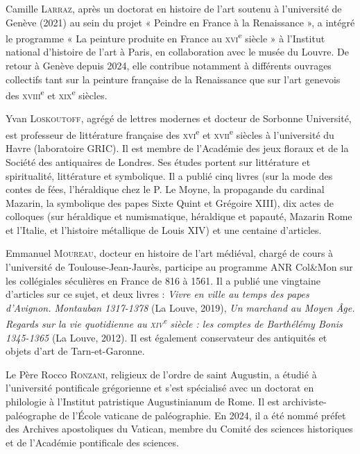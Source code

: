 \documentclass[12pt,twoside,openany]{book}
\begin{document}
Camille \textsc{Larraz}, après un doctorat en histoire de l’art soutenu à l’université de Genève (2021) au sein du projet « Peindre en France à la Renaissance », a intégré le programme « La peinture produite en France au \textsc{xvi}\textsuperscript{e} siècle » à l’Institut national d’histoire de l’art à Paris, en collaboration avec le musée du Louvre. De retour à Genève depuis 2024, elle contribue notamment à différents ouvrages collectifs tant sur la peinture française de la Renaissance que sur l’art genevois des \textsc{xviii}\textsuperscript{e} et \textsc{xix}\textsuperscript{e} siècles.

Yvan \textsc{Loskoutoff}, agrégé de lettres modernes et docteur de Sorbonne Université, est professeur de littérature française des \textsc{xvi}\textsuperscript{e} et \textsc{xvii}\textsuperscript{e} siècles à l’université du Havre (laboratoire GRIC). Il est membre de l’Académie des jeux floraux et de la Société des antiquaires de Londres. Ses études portent sur littérature et spiritualité, littérature et symbolique. Il a publié cinq livres (sur la mode des contes de fées, l’héraldique chez le P. Le Moyne, la propagande du cardinal Mazarin, la symbolique des papes Sixte Quint et Grégoire XIII), dix actes de colloques (sur héraldique et numismatique, héraldique et papauté, Mazarin Rome et l’Italie, et l’histoire métallique de Louis XIV) et une centaine d’articles.

Emmanuel \textsc{Moureau}, docteur en histoire de l’art médiéval, chargé de cours à l’université de Toulouse-Jean-Jaurès, participe au programme ANR Col\&Mon sur les collégiales séculières en France de 816 à 1561. Il a publié une vingtaine d’articles sur ce sujet, et deux livres : \textit{Vivre en ville au temps des papes d’Avignon. Montauban 1317-1378} (La Louve, 2019), \textit{Un marchand au Moyen Âge. Regards sur la vie quotidienne au }\textit{\textsc{xiv}}\textit{\textsuperscript{e}}\textit{ siècle : les comptes de Barthélémy Bonis 1345-1365} (La Louve, 2012). Il est également conservateur des antiquités et objets d’art de Tarn-et-Garonne.

Le Père Rocco \textsc{Ronzani}, religieux de l’ordre de saint Augustin, a étudié à l’université pontificale grégorienne et s’est spécialisé avec un doctorat en philologie à l’Institut patristique Augustinianum de Rome. Il est archiviste-paléographe de l’École vaticane de paléographie. En 2024, il a été nommé préfet des Archives apostoliques du Vatican, membre du Comité des sciences historiques et de l’Académie pontificale des sciences.

\cleardoublepage

\tableofcontents
\end{document}
